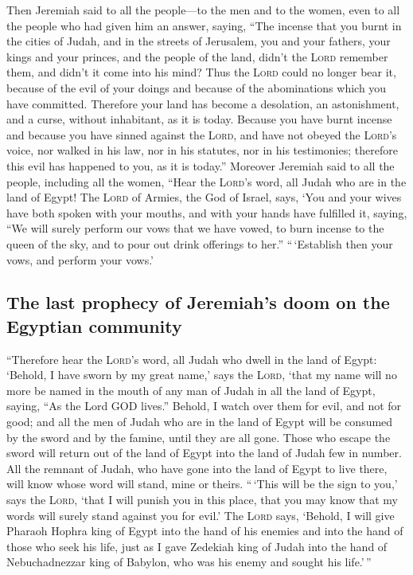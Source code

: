  Then Jeremiah said to all the people---to the men and to
the women, even to all the people who had given him an answer, saying,
 ``The incense that you burnt in the cities of Judah, and
in the streets of Jerusalem, you and your fathers, your kings and your
princes, and the people of the land, didn't the \textsc{Lord} remember
them, and didn't it come into his mind?  Thus the
\textsc{Lord} could no longer bear it, because of the evil of your
doings and because of the abominations which you have committed.
Therefore your land has become a desolation, an astonishment, and a
curse, without inhabitant, as it is today.  Because you
have burnt incense and because you have sinned against the
\textsc{Lord}, and have not obeyed the \textsc{Lord}'s voice, nor walked
in his law, nor in his statutes, nor in his testimonies; therefore this
evil has happened to you, as it is today.''  Moreover
Jeremiah said to all the people, including all the women, ``Hear the
\textsc{Lord}'s word, all Judah who are in the land of Egypt!
 The \textsc{Lord} of Armies, the God of Israel, says,
`You and your wives have both spoken with your mouths, and with your
hands have fulfilled it, saying, ``We will surely perform our vows that
we have vowed, to burn incense to the queen of the sky, and to pour out
drink offerings to her.'' ``\,`Establish then your vows, and perform
your vows.'

\hypertarget{the-last-prophecy-of-jeremiahs-doom-on-the-egyptian-community}{%
\subsection{The last prophecy of Jeremiah's doom on the Egyptian
community}\label{the-last-prophecy-of-jeremiahs-doom-on-the-egyptian-community}}

 ``Therefore hear the \textsc{Lord}'s word, all Judah who
dwell in the land of Egypt: `Behold, I have sworn by my great name,'
says the \textsc{Lord}, `that my name will no more be named in the mouth
of any man of Judah in all the land of Egypt, saying, ``As the Lord GOD
lives.''  Behold, I watch over them for evil, and not for
good; and all the men of Judah who are in the land of Egypt will be
consumed by the sword and by the famine, until they are all gone.
 Those who escape the sword will return out of the land
of Egypt into the land of Judah few in number. All the remnant of Judah,
who have gone into the land of Egypt to live there, will know whose word
will stand, mine or theirs.  ``\,`This will be the sign
to you,' says the \textsc{Lord}, `that I will punish you in this place,
that you may know that my words will surely stand against you for evil.'
 The \textsc{Lord} says, `Behold, I will give Pharaoh
Hophra king of Egypt into the hand of his enemies and into the hand of
those who seek his life, just as I gave Zedekiah king of Judah into the
hand of Nebuchadnezzar king of Babylon, who was his enemy and sought his
life.'\,''

